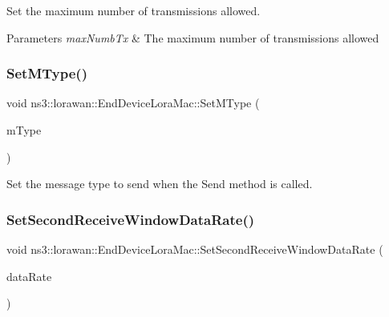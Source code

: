 Set the maximum number of transmissions allowed.


\begin{DoxyParams}{Parameters}
{\em max\+Numb\+Tx} & The maximum number of transmissions allowed \\
\hline
\end{DoxyParams}
\mbox{\label{classns3_1_1lorawan_1_1EndDeviceLoraMac_ac1142dacc77786c0e83d364c30a61900}} 
\subsubsection{\texorpdfstring{Set\+M\+Type()}{SetMType()}}
{\footnotesize\ttfamily void ns3\+::lorawan\+::\+End\+Device\+Lora\+Mac\+::\+Set\+M\+Type (\begin{DoxyParamCaption}\item[{\hyperlink{classns3_1_1lorawan_1_1LoraMacHeader_afd050ac67eab24871452323799e07e94}{Lora\+Mac\+Header\+::\+M\+Type}}]{m\+Type }\end{DoxyParamCaption})}

Set the message type to send when the Send method is called. \mbox{\label{classns3_1_1lorawan_1_1EndDeviceLoraMac_a1665b5bad99ef1ee5ca726e8efb6736d}} 
\subsubsection{\texorpdfstring{Set\+Second\+Receive\+Window\+Data\+Rate()}{SetSecondReceiveWindowDataRate()}}
{\footnotesize\ttfamily void ns3\+::lorawan\+::\+End\+Device\+Lora\+Mac\+::\+Set\+Second\+Receive\+Window\+Data\+Rate (\begin{DoxyParamCaption}\item[{uint8\+\_\+t}]{data\+Rate }\end{DoxyParamCaption})}

